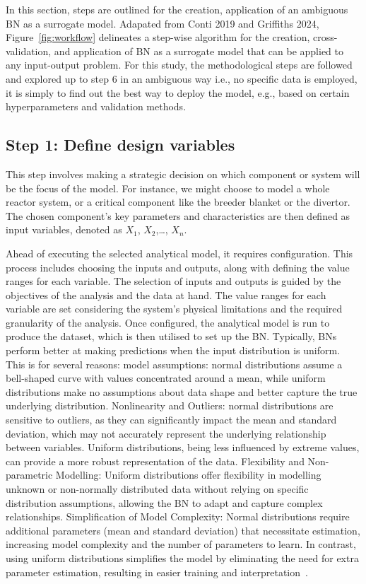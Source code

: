 \documentclass[journal]{IEEEtran}
\begin{document}
In this section, steps are outlined for the creation, application of an ambiguous BN as a surrogate model. Adapated from Conti 2019 and Griffiths 2024, Figure~\ref{fig:workflow} delineates a step-wise algorithm for the creation, cross-validation, and application of BN as a surrogate model that can be applied to any input-output problem. For this study, the methodological steps are followed and explored up to step 6 in an ambiguous way i.e., no specific data is employed, it is simply to find out the best way to deploy the model, e.g., based on certain hyperparameters and validation methods. 

\subsection{\textbf{Step 1}: Define design variables}\label{sec:design}
This step involves making a strategic decision on which component or system will be the focus of the model. For instance, we might choose to model a whole reactor system, or a critical component like the breeder blanket or the divertor. The chosen component's key parameters and characteristics are then defined as input variables, denoted as $X_1$, $X_2$,\ldots, $X_n$.

Ahead of executing the selected analytical model, it requires configuration. This process includes choosing the inputs and outputs, along with defining the value ranges for each variable. The selection of inputs and outputs is guided by the objectives of the analysis and the data at hand. The value ranges for each variable are set considering the system's physical limitations and the required granularity of the analysis. Once configured, the analytical model is run to produce the dataset, which is then utilised to set up the BN. Typically, BNs perform better at making predictions when the input distribution is uniform. This is for several reasons: model assumptions: normal distributions assume a bell-shaped curve with values concentrated around a mean, while uniform distributions make no assumptions about data shape and better capture the true underlying distribution. Nonlinearity and Outliers: normal distributions are sensitive to outliers, as they can significantly impact the mean and standard deviation, which may not accurately represent the underlying relationship between variables. Uniform distributions, being less influenced by extreme values, can provide a more robust representation of the data. Flexibility and Non-parametric Modelling: Uniform distributions offer flexibility in modelling unknown or non-normally distributed data without relying on specific distribution assumptions, allowing the BN to adapt and capture complex relationships. Simplification of Model Complexity: Normal distributions require additional parameters (mean and standard deviation) that necessitate estimation, increasing model complexity and the number of parameters to learn. In contrast, using uniform distributions simplifies the model by eliminating the need for extra parameter estimation, resulting in easier training and interpretation~\cite{Duda1973,Neapolitan2004,Koller2009}.
\end{document}
